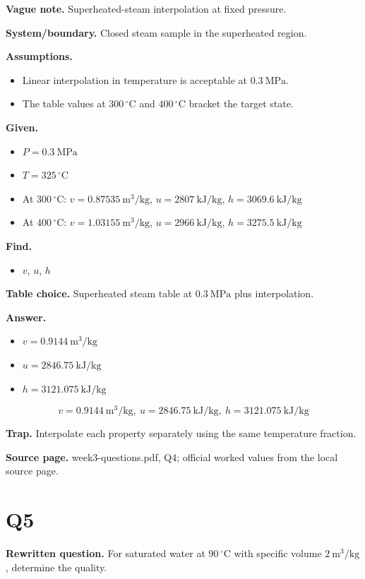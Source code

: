 \textbf{Vague note.} Superheated-steam interpolation at fixed pressure.

\textbf{System/boundary.} Closed steam sample in the superheated region.

\textbf{Assumptions.}
\begin{itemize}
  \item Linear interpolation in temperature is acceptable at $0.3\ \mathrm{MPa}$.
  \item The table values at $300\,^{\circ}\mathrm{C}$ and $400\,^{\circ}\mathrm{C}$ bracket the target state.
\end{itemize}

\textbf{Given.}
\begin{itemize}
  \item $P = 0.3\ \mathrm{MPa}$
  \item $T = 325\,^{\circ}\mathrm{C}$
  \item At $300\,^{\circ}\mathrm{C}$: $v=0.87535\ \mathrm{m^3/kg}$, $u=2807\ \mathrm{kJ/kg}$, $h=3069.6\ \mathrm{kJ/kg}$
  \item At $400\,^{\circ}\mathrm{C}$: $v=1.03155\ \mathrm{m^3/kg}$, $u=2966\ \mathrm{kJ/kg}$, $h=3275.5\ \mathrm{kJ/kg}$
\end{itemize}

\textbf{Find.}
\begin{itemize}
  \item $v$, $u$, $h$
\end{itemize}

\textbf{Table choice.} Superheated steam table at $0.3\ \mathrm{MPa}$ plus interpolation.

\textbf{Answer.}
\begin{itemize}
  \item $v = 0.9144\ \mathrm{m^3/kg}$
  \item $u = 2846.75\ \mathrm{kJ/kg}$
  \item $h = 3121.075\ \mathrm{kJ/kg}$
\end{itemize}

\[\boxed{v = 0.9144\ \mathrm{m^3/kg},\ u = 2846.75\ \mathrm{kJ/kg},\ h = 3121.075\ \mathrm{kJ/kg}}\]

\textbf{Trap.} Interpolate each property separately using the same temperature fraction.

\textbf{Source page.} week3-questions.pdf, Q4; official worked values from the local source page.

\section*{Q5}
\textbf{Rewritten question.} For saturated water at $90\,^{\circ}\mathrm{C}$ with specific volume $2\ \mathrm{m^3/kg}$, determine the quality.

